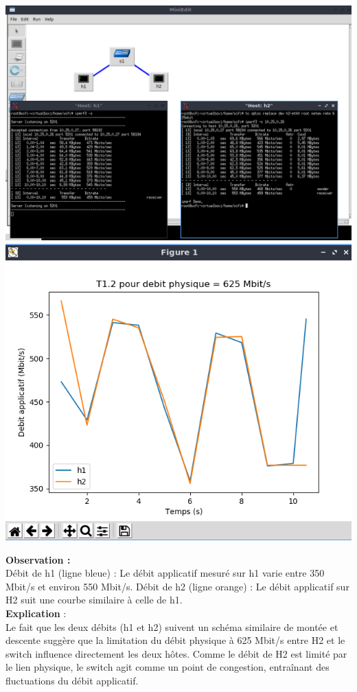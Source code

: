 \begin{center}
    \includegraphics[width=1\textwidth]{./images/T1.2/625test2.png}
    \includegraphics[width=1\textwidth]{./images/T1.2/courbe625test2.png}
\end{center}
\textbf{Observation :}\\
Débit de h1 (ligne bleue) : Le débit applicatif mesuré sur h1 varie entre 350 Mbit/s et environ 550 Mbit/s.
Débit de h2 (ligne orange) : Le débit applicatif sur H2 suit une courbe similaire à celle de h1.
\\
\textbf{Explication} :\\
Le fait que les deux débits (h1 et h2) suivent un schéma similaire de montée et descente suggère que la limitation du débit physique à 625 Mbit/s entre H2 et le switch influence directement les deux hôtes. Comme le débit de H2 est limité par le lien physique, le switch agit comme un point de congestion, entraînant des fluctuations du débit applicatif.
